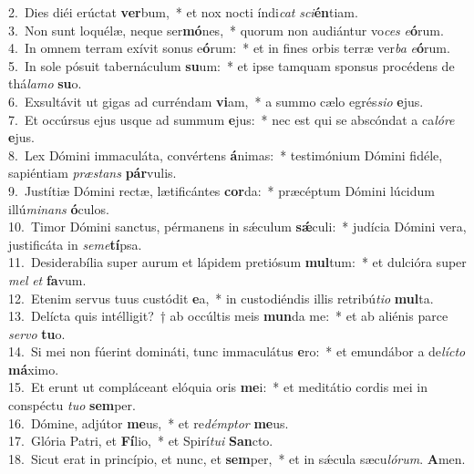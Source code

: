 {2.~}Dies diéi erúctat \textbf{ver}bum,~* et nox nocti índi\textit{cat} \textit{sci}\textbf{én}tiam.\\
{3.~}Non sunt loquélæ, neque ser\textbf{mó}nes,~* quorum non audiántur vo\textit{ces} \textit{e}\textbf{ó}rum.\\
{4.~}In omnem terram exívit sonus e\textbf{ó}rum:~* et in fines orbis terræ ver\textit{ba} \textit{e}\textbf{ó}rum.\\
{5.~}In sole pósuit tabernáculum \textbf{su}um:~* et ipse tamquam sponsus procédens de thá\textit{la}\textit{mo} \textbf{su}o.\\
{6.~}Exsultávit ut gigas ad curréndam \textbf{vi}am,~* a summo cælo egrés\textit{si}\textit{o} \textbf{e}jus.\\
{7.~}Et occúrsus ejus usque ad summum \textbf{e}jus:~* nec est qui se abscóndat a ca\textit{ló}\textit{re} \textbf{e}jus.\\
{8.~}Lex Dómini immaculáta, convértens \textbf{á}nimas:~* testimónium Dómini fidéle, sapiéntiam \textit{præ}\textit{stans} \textbf{pár}vulis.\\
{9.~}Justítiæ Dómini rectæ, lætificántes \textbf{cor}da:~* præcéptum Dómini lúcidum illú\textit{mi}\textit{nans} \textbf{ó}culos.\\
{10.~}Timor Dómini sanctus, pérmanens in sǽculum \textbf{sǽ}culi:~* judícia Dómini vera, justificáta in \textit{se}\textit{me}\textbf{tí}psa.\\
{11.~}Desiderabília super aurum et lápidem pretiósum \textbf{mul}tum:~* et dulcióra super \textit{mel} \textit{et} \textbf{fa}vum.\\
{12.~}Etenim servus tuus custódit \textbf{e}a,~* in custodiéndis illis retribú\textit{ti}\textit{o} \textbf{mul}ta.\\
{13.~}Delícta quis intélligit?~† ab occúltis meis \textbf{mun}da me:~* et ab aliénis parce \textit{ser}\textit{vo} \textbf{tu}o.\\
{14.~}Si mei non fúerint domináti, tunc immaculátus \textbf{e}ro:~* et emundábor a de\textit{lí}\textit{cto} \textbf{má}ximo.\\
{15.~}Et erunt ut compláceant elóquia oris \textbf{me}i:~* et meditátio cordis mei in conspéctu \textit{tu}\textit{o} \textbf{sem}per.\\
{16.~}Dómine, adjútor \textbf{me}us,~* et re\textit{dém}\textit{ptor} \textbf{me}us.\\
{17.~}Glória Patri, et \textbf{Fí}lio,~* et Spirí\textit{tu}\textit{i} \textbf{San}cto.\\
{18.~}Sicut erat in princípio, et nunc, et \textbf{sem}per,~* et in sǽcula sæcu\textit{ló}\textit{rum}. \textbf{A}men.\\
